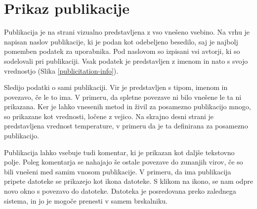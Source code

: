 \documentclass[a4paper, 12pt]{book}
\begin{document}
\section{Prikaz publikacije}
Publikacija je na strani vizualno predstavljena z vso vnešeno vsebino. Na vrhu je napisan naslov publikacije, ki je podan kot odebeljeno besedilo, saj je najbolj pomemben podatek za uporabnika. Pod naslovom so izpisani vsi avtorji, ki so sodelovali pri publikaciji. Vsak podatek je predstavljen z imenom in nato s svojo vrednostjo (Slika \ref{publicitation-info}).

Sledijo podatki o sami publikaciji. Vir je predstavljen s tipom, imenom in povezavo, če le to ima. V primeru, da spletne povezave ni bilo vnešene le ta ni prikazana. Ker je lahko vnesenih metod in živil za posamezno publikacijo mnogo, so prikazane kot vrednosti, ločene z vejico. Na skrajno desni strani je predstavljena vrednost temperature, v primeru da je ta definirana za posamezno publikacijo. 

Publikacija lahko vsebuje tudi komentar, ki je prikazan kot daljše tekstovno polje. Poleg komentarja se nahajajo še ostale povezave do zunanjih virov, če so bili vnešeni med samim vnosom publikacije. V primeru, da ima publikacija pripete datoteke se prikazejo kot ikona datoteke. S klikom na ikono, se nam odpre novo okno s povezavo do datoteke. Datoteka je posredovana preko zalednega sistema, in jo je mogoče prenesti v samem brskalniku.
\end{document}
